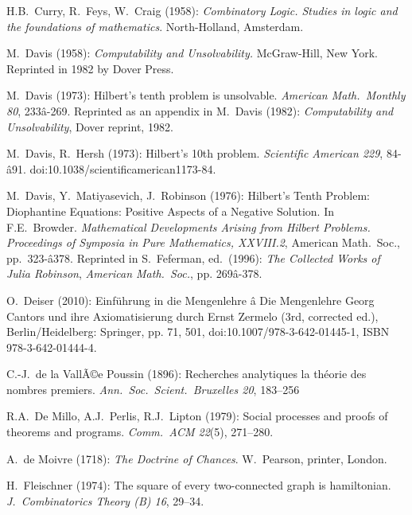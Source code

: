 \begin{thebibliography}{999}
H.B.~Curry, R.~Feys, W.~Craig (1958):
{\it Combinatory Logic.  Studies in logic and the foundations of
mathematics}.  North-Holland, Amsterdam.


M.~Davis (1958):
{\it Computability and Unsolvability.}
McGraw-Hill, New York.  Reprinted in 1982 by Dover Press.

M.~Davis (1973):
Hilbert's tenth problem is unsolvable.
{\it American Math.~Monthly 80}, 233â-269.  Reprinted as an appendix
in M.~Davis (1982): {\it Computability and Unsolvability}, Dover
reprint, 1982.

M.~Davis, R.~Hersh (1973): 
Hilbert's 10th problem.  {\it Scientific American 229},
84-â91.  doi:10.1038/scientificamerican1173-84.

M.~Davis, Y.~Matiyasevich, J.~Robinson (1976): Hilbert's Tenth
Problem: Diophantine Equations: Positive Aspects of a Negative
Solution.  In F.E.~Browder.  {\it Mathematical Developments Arising
  from Hilbert Problems.}  {\it Proceedings of Symposia in Pure
  Mathematics, XXVIII.2}, American Math.~Soc., pp.~323-â378.
Reprinted in S.~Feferman, ed.~(1996): {\it The Collected Works of
  Julia Robinson}, {\it American Math.~Soc.}, pp. 269â-378.

O.~Deiser (2010): Einf\"{u}hrung in die Mengenlehre â Die Mengenlehre
Georg Cantors und ihre Axiomatisierung durch Ernst Zermelo (3rd,
corrected ed.), Berlin/Heidelberg: Springer, pp. 71, 501,
doi:10.1007/978-3-642-01445-1, ISBN 978-3-642-01444-4.

C.-J.~de la VallÃ©e Poussin (1896):
Recherches analytiques la th\'{e}orie des nombres premiers.
{\it Ann.~Soc.~Scient.~Bruxelles 20}, 183--256

R.A.~De Millo, A.J.~Perlis, R.J.~Lipton (1979):
Social processes and proofs of theorems and programs.
{\it Comm.~ACM 22}(5), 271--280.

A.~de Moivre (1718):
{\it The Doctrine of Chances}.
W.~Pearson, printer, London.




H.~Fleischner (1974):
The square of every two-connected graph is hamiltonian.
{\it J.~Combinatorics Theory (B) 16}, 29--34.


\end{thebibliography}
